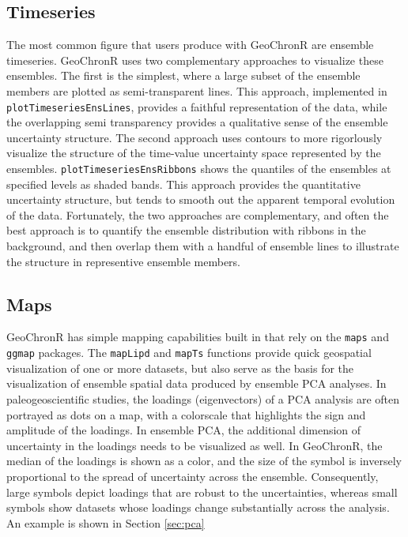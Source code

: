 \documentclass[gchron, manuscript]{copernicus}
\begin{document}
\subsection{Timeseries}

The most common figure that users produce with GeoChronR are ensemble timeseries.
GeoChronR uses two complementary approaches to visualize these ensembles.
The first is the simplest, where a large subset of the ensemble members are plotted as semi-transparent lines.
This approach, implemented in \texttt{plotTimeseriesEnsLines}, provides a faithful representation of the data, while the overlapping semi transparency provides a qualitative sense of the ensemble uncertainty structure.
The second approach uses contours to more rigorlously visualize the structure of the time-value uncertainty space represented by the ensembles.
\texttt{plotTimeseriesEnsRibbons} shows the quantiles of the ensembles at specified levels as shaded bands.
This approach provides the quantitative uncertainty structure, but tends to smooth out the apparent temporal evolution of the data.
Fortunately, the two approaches are complementary, and often the best approach is to quantify the ensemble distribution with ribbons in the background, and then overlap them with a handful of ensemble lines to illustrate the structure in representive ensemble members.

\subsection{Maps}

GeoChronR has simple mapping capabilities built in that rely on the \texttt{maps} \citep{maps} and \texttt{ggmap} \citep{ggmap} packages.
The \texttt{mapLipd} and \texttt{mapTs} functions provide quick geospatial visualization of one or more datasets, but also serve as the basis for the visualization of ensemble spatial data produced by ensemble PCA analyses.
In paleogeoscientific studies, the loadings (eigenvectors) of a PCA analysis are often portrayed as dots on a map, with a colorscale that highlights the sign and amplitude of the loadings.
In ensemble PCA, the additional dimension of uncertainty in the loadings needs to be visualized as well.
In GeoChronR, the median of the loadings is shown as a color, and the size of the symbol is inversely proportional to the spread of uncertainty across the ensemble.
Consequently, large symbols depict loadings that are robust to the uncertainties, whereas small symbols show datasets whose loadings change substantially across the analysis.
An example is shown in Section \ref{sec:pca}
\end{document}
